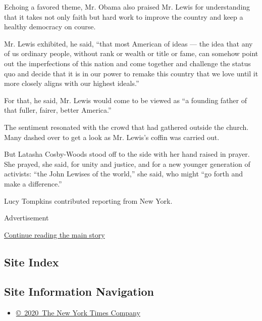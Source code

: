 Echoing a favored theme, Mr. Obama also praised Mr. Lewis for
understanding that it takes not only faith but hard work to improve the
country and keep a healthy democracy on course.

Mr. Lewis exhibited, he said, ``that most American of ideas --- the idea
that any of us ordinary people, without rank or wealth or title or fame,
can somehow point out the imperfections of this nation and come together
and challenge the status quo and decide that it is in our power to
remake this country that we love until it more closely aligns with our
highest ideals.''

For that, he said, Mr. Lewis would come to be viewed as ``a founding
father of that fuller, fairer, better America.''

The sentiment resonated with the crowd that had gathered outside the
church. Many dashed over to get a look as Mr. Lewis's coffin was carried
out.

But Latasha Cosby-Woods stood off to the side with her hand raised in
prayer. She prayed, she said, for unity and justice, and for a new
younger generation of activists: ``the John Lewises of the world,'' she
said, who might ``go forth and make a difference.''

Lucy Tompkins contributed reporting from New York.

Advertisement

\protect\hyperlink{after-bottom}{Continue reading the main story}

\hypertarget{site-index}{%
\subsection{Site Index}\label{site-index}}

\hypertarget{site-information-navigation}{%
\subsection{Site Information
Navigation}\label{site-information-navigation}}

\begin{itemize}
\tightlist
\item
  \href{https://help.nytimes3xbfgragh.onion/hc/en-us/articles/115014792127-Copyright-notice}{©~2020~The
  New York Times Company}
\end{itemize}

